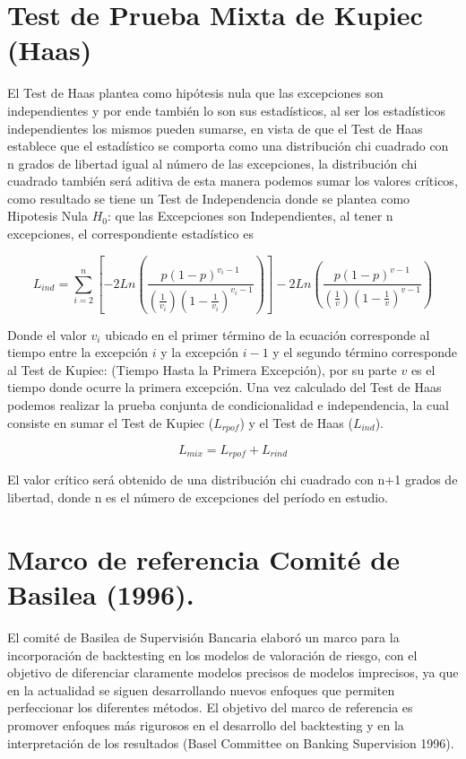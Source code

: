 \documentclass[
  12pt,
]{krantz}
\begin{document}
\hypertarget{test-de-prueba-mixta-de-kupiec-haas}{%
\section{Test de Prueba Mixta de Kupiec (Haas)}\label{test-de-prueba-mixta-de-kupiec-haas}}

El Test de Haas plantea como hipótesis nula que las excepciones son independientes y por ende también lo son sus estadísticos, al ser los estadísticos independientes los mismos pueden sumarse, en vista de que el Test de Haas establece que el estadístico se comporta como una distribución chi cuadrado con n grados de libertad igual al número de las excepciones, la distribución chi cuadrado también será aditiva de esta manera podemos sumar los valores críticos, como resultado se tiene un Test de Independencia donde se plantea como Hipotesis Nula \(H_0\): que las Excepciones son Independientes, al tener n excepciones, el correspondiente estadístico es

\[L_{ind} = \sum_{i=2}^{n} \left[- 2Ln\left( \frac{p(1-p)^{v_i-1}}{\left(\frac{1}{v_i}\right) \left( 1- \frac{1}{v_i}\right)^{v_i-1}}\right)\right] - 2Ln\left( \frac{p(1-p)^{v-1}}{\left(\frac{1}{v}\right) \left( 1- \frac{1}{v}\right)^{v-1}}\right)\]

Donde el valor \(v_i\) ubicado en el primer término de la ecuación corresponde al tiempo entre la excepción \(i\) y la excepción \(i-1\) y el segundo término corresponde al Test de Kupiec: (Tiempo Hasta la Primera Excepción), por su parte \(v\) es el tiempo donde ocurre la primera excepción. Una vez calculado del Test de Haas podemos realizar la prueba conjunta de condicionalidad e independencia, la cual consiste en sumar el Test de Kupiec (\(L_{rpof}\)) y el Test de Haas (\(L_{ind}\)).

\[L_{mix} = L_{rpof}+L_{rind}\]

El valor crítico será obtenido de una distribución chi cuadrado con n+1 grados de libertad, donde n es el número de excepciones del período en estudio.

\hypertarget{marco-de-referencia-comite-de-basilea-1996.}{%
\section{Marco de referencia Comité de Basilea (1996).}\label{marco-de-referencia-comite-de-basilea-1996.}}

El comité de Basilea de Supervisión Bancaria elaboró un marco para la incorporación de backtesting en los modelos de valoración de riesgo, con el objetivo de diferenciar claramente modelos precisos de modelos imprecisos, ya que en la actualidad se siguen desarrollando nuevos enfoques que permiten perfeccionar los diferentes métodos. El objetivo del marco de referencia es promover enfoques más rigurosos en el desarrollo del backtesting y en la interpretación de los resultados (Basel Committee on Banking Supervision 1996).
\end{document}
